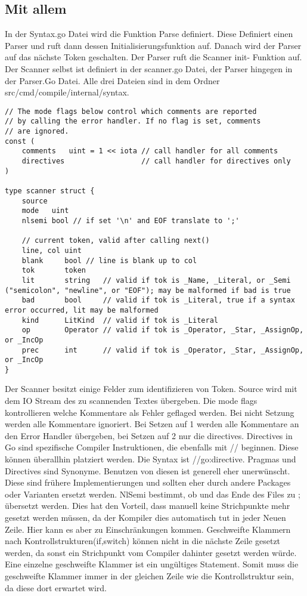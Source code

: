 \subsection{Mit allem}
In der Syntax.go Datei wird die Funktion Parse definiert. Diese Definiert einen Parser und ruft dann dessen Initialisierungsfunktion auf. Danach wird der Parser auf das nächste Token geschalten. 
Der Parser ruft die Scanner init- Funktion auf. Der Scanner selbst ist definiert in der scanner.go Datei, der Parser hingegen in der Parser.Go Datei. Alle drei Dateien sind in dem Ordner src/cmd/compile/internal/syntax. 
\cite{donovan_go_2016}
\begin{lstlisting}
// The mode flags below control which comments are reported
// by calling the error handler. If no flag is set, comments
// are ignored.
const (
	comments   uint = 1 << iota // call handler for all comments
	directives                  // call handler for directives only
)

type scanner struct {
	source
	mode   uint
	nlsemi bool // if set '\n' and EOF translate to ';'

	// current token, valid after calling next()
	line, col uint
	blank     bool // line is blank up to col
	tok       token
	lit       string   // valid if tok is _Name, _Literal, or _Semi ("semicolon", "newline", or "EOF"); may be malformed if bad is true
	bad       bool     // valid if tok is _Literal, true if a syntax error occurred, lit may be malformed
	kind      LitKind  // valid if tok is _Literal
	op        Operator // valid if tok is _Operator, _Star, _AssignOp, or _IncOp
	prec      int      // valid if tok is _Operator, _Star, _AssignOp, or _IncOp
}
\end{lstlisting}
Der Scanner besitzt einige Felder zum identifizieren von Token. 
Source wird mit dem IO Stream des zu scannenden Textes übergeben.
Die mode flags kontrollieren welche Kommentare als Fehler geflaged werden. 
Bei nicht Setzung werden alle Kommentare ignoriert. Bei Setzen auf 1 werden alle Kommentare an den Error Handler übergeben, bei Setzen auf 2 nur die directives. Directives in Go sind spezifische Compiler Instruktionen, die ebenfalls mit // beginnen. Diese können überallhin platziert werden. Die Syntax ist //go:directive. Pragmas und Directives sind Synonyme. Benutzen von diesen ist generell eher unerwünscht. Diese sind frühere Implementierungen und sollten eher durch andere Packages oder Varianten ersetzt werden.
NlSemi bestimmt, ob  und das Ende des Files zu ; übersetzt werden. Dies hat den Vorteil, dass manuell keine Strichpunkte mehr gesetzt werden müssen, da der Kompiler dies automatisch tut in jeder Neuen Zeile. Hier kann es aber zu Einschränkungen kommen. Geschweifte Klammern nach Kontrollstrukturen(if,switch) können nicht in die nächste Zeile gesetzt werden, da sonst ein Strichpunkt vom Compiler dahinter gesetzt werden würde. Eine einzelne geschweifte Klammer ist ein ungültiges Statement. Somit muss die geschweifte Klammer immer in der gleichen Zeile wie die Kontrollstruktur sein, da diese dort erwartet wird. 
